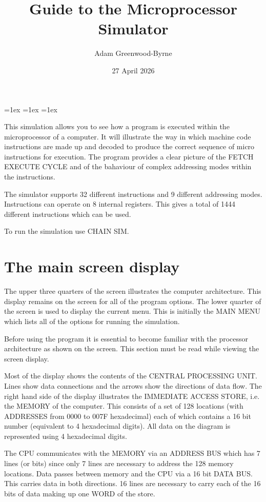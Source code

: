 \documentclass{article}
\title{Guide to the Microprocessor Simulator}
\author{Adam Greenwood-Byrne}
\date{27 April 2026}
\begin{document}
\maketitle

\ttfamily
{}\font=1ex %
\font=1ex %
\font=1ex %

This simulation allows you to see how a program is executed within the microprocessor of a computer. It will illustrate the way in which machine code instructions are made up and decoded to produce the correct sequence of micro instructions for execution. The program provides a clear picture of the FETCH EXECUTE CYCLE and of the bahaviour of complex addressing modes within the instructions.

The simulator supports 32 different instructions and 9 different addressing modes. Instructions can operate on 8 internal registers. This gives a total of 1444 different instructions which can be used.

To run the simulation use CHAIN SIM.

\tableofcontents

\newpage

\section{The main screen display}

The upper three quarters of the screen illustrates the computer architecture. This display remains on the screen for all of the program options. The lower quarter of the screen is used to display the current menu. This is initially the MAIN MENU which lists all of the options for running the simulation.

Before using the program it is essential to become familiar with the processor architecture as shown on the screen. This section must be read while viewing the screen display.

Most of the display shows the contents of the CENTRAL PROCESSING UNIT. Lines show data connections and the arrows show the directions of data flow. The right hand side of the display illustrates the IMMEDIATE ACCESS STORE, i.e. the MEMORY of the computer. This consists of a set of 128 locations (with ADDRESSES from 0000 to 007F hexadecimal) each of which contains a 16 bit number (equivalent to 4 hexadecimal digits). All data on the diagram is represented using 4 hexadecimal digits.

The CPU communicates with the MEMORY via an ADDRESS BUS which has 7 lines (or bits) since only 7 lines are necessary to address the 128 memory locations. Data passes between memory and the CPU via a 16 bit DATA BUS. This carries data in both directions. 16 lines are necessary to carry each of the 16 bits of data making up one WORD of the store.
\end{document}
